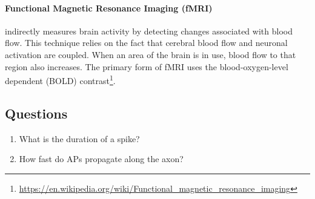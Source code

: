 \documentclass[main]{subfiles}
\begin{document}
\paragraph{Functional Magnetic Resonance Imaging (fMRI)} indirectly measures brain activity by detecting changes associated with blood flow. This technique relies on the fact that cerebral blood flow and neuronal activation are coupled. When an area of the brain is in use, blood flow to that region also increases. The primary form of fMRI uses the blood-oxygen-level dependent (BOLD) contrast\footnote{\url{https://en.wikipedia.org/wiki/Functional_magnetic_resonance_imaging}}.

\subsection{Questions}
\begin{enumerate}
    \item What is the duration of a spike?
    \item How fast do APs propagate along the axon?
\end{enumerate}
\end{document}
